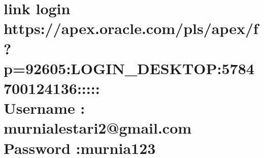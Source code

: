 \documentclass{article}
\begin{document}
\section{link login  
https://apex.oracle.com/pls/apex/f?p=92605:LOGIN_DESKTOP:5784700124136:::::\\
Username : murnialestari2@gmail.com\\
Password :murnia123}
\end{document}
